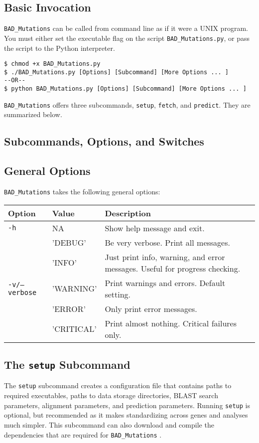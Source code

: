 \documentclass[12pt]{article}
\newcommand{\BM}{\texttt{BAD\_Mutations} }
\begin{document}
\subsection*{Basic Invocation}
\par \BM can be called from command line as if it were a UNIX program. You must
either set the executable flag on the script \texttt{BAD\_Mutations.py}, or
pass the script to the Python interpreter.
\begin{Verbatim}[frame=single, fontsize=\small, rulecolor=\color{gray}]
$ chmod +x BAD_Mutations.py
$ ./BAD_Mutations.py [Options] [Subcommand] [More Options ... ]
--OR--
$ python BAD_Mutations.py [Options] [Subcommand] [More Options ... ]
\end{Verbatim}
\par \BM offers three subcommands, \texttt{setup}, \texttt{fetch}, and
\texttt{predict}. They are summarized below.

\subsection*{Subcommands, Options, and Switches}
\subsection*{General Options}
\par \BM takes the following general options:
\begin{table}[h]
    \centering
    \begin{tabular}{p{105pt} l p{260pt}}
    \toprule
    Option & Value & Description \\
    \midrule
    \texttt{-h} & NA & Show help message and exit. \\
    \midrule
    & 'DEBUG' & Be very verbose. Print all messages.\\ \cmidrule{2-3}
    & 'INFO' & Just print info, warning, and error messages. Useful for progress checking.\\ \cmidrule{2-3}
    \texttt{-v/--verbose} & 'WARNING' & Print warnings and errors. Default setting. \\ \cmidrule{2-3}
    & 'ERROR' & Only print error messages. \\ \cmidrule{2-3}
    & 'CRITICAL' & Print almost nothing. Critical failures only. \\
    \bottomrule
    \end{tabular}
\end{table}
\subsection*{The \texttt{setup} Subcommand}
\par The \texttt{setup} subcommand creates a configuration file that contains
paths to required executables, paths to data storage directories, BLAST search
parameters, alignment parameters, and prediction parameters. Running
\texttt{setup} is optional, but recommended as it makes standardizing across
genes and analyses much simpler. This subcommand can also download and compile
the dependencies that are required for \BM.
\end{document}
